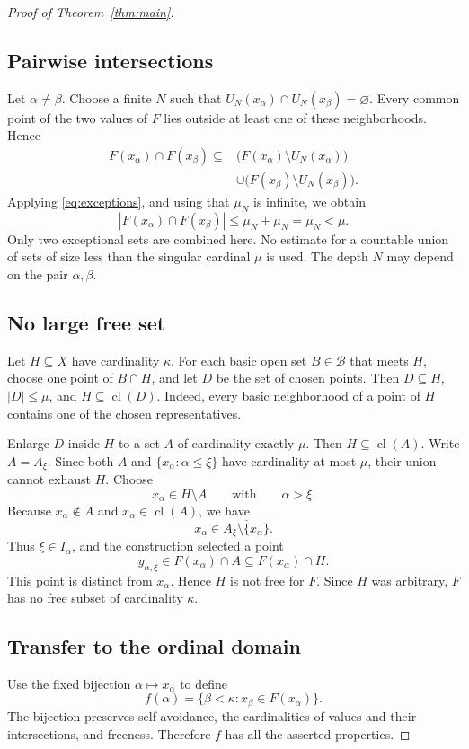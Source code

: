 \documentclass[10pt,leqno]{amsart}
\numberwithin{equation}{section}
\newcommand{\cl}{\operatorname{cl}}
\begin{document}
\begin{proof}[Proof of Theorem~\ref{thm:main}]
\subsection{Pairwise intersections}
Let $\alpha\ne\beta$. Choose a finite $N$ such that
$U_N(x_\alpha)\cap U_N(x_\beta)=\varnothing$. Every common point of the two
values of $F$ lies outside at least one of these neighborhoods. Hence
\[
\begin{split}
 F(x_\alpha)\cap F(x_\beta)\subseteq{}&
   \bigl(F(x_\alpha)\setminus U_N(x_\alpha)\bigr)\\
   &\mathbin{\cup}\bigl(F(x_\beta)\setminus U_N(x_\beta)\bigr).
\end{split}
\]
Applying \eqref{eq:exceptions}, and using that $\mu_N$ is infinite, we obtain
\begin{equation}\label{eq:intersections}
 |F(x_\alpha)\cap F(x_\beta)|
        \leq\mu_N+\mu_N=\mu_N<\mu.
\end{equation}
Only two exceptional sets are combined here. No estimate for a countable
union of sets of size less than the singular cardinal $\mu$ is used. The
depth $N$ may depend on the pair $\alpha,\beta$.

\subsection{No large free set}
Let $H\subseteq X$ have cardinality $\kappa$. For each basic open set
$B\in\mathcal B$ that meets $H$, choose one point of $B\cap H$, and let $D$
be the set of chosen points. Then $D\subseteq H$, $|D|\leq\mu$, and
$H\subseteq\cl(D)$. Indeed, every basic neighborhood of a point of $H$
contains one of the chosen representatives.

Enlarge $D$ inside $H$ to a set $A$ of cardinality exactly $\mu$. Then
$H\subseteq\cl(A)$. Write $A=A_\xi$. Since both $A$ and
$\{x_\alpha:\alpha\leq\xi\}$ have cardinality at most $\mu$, their union
cannot exhaust $H$. Choose
\[
 x_\alpha\in H\setminus A\qquad\text{with}\qquad\alpha>\xi.
\]
Because $x_\alpha\notin A$ and $x_\alpha\in\cl(A)$, we have
\[
 x_\alpha\in\overline{A_\xi\setminus\{x_\alpha\}}.
\]
Thus $\xi\in I_\alpha$, and the construction selected a point
\[
 y_{\alpha,\xi}\in F(x_\alpha)\cap A\subseteq F(x_\alpha)\cap H.
\]
This point is distinct from $x_\alpha$. Hence $H$ is not free for $F$.
Since $H$ was arbitrary, $F$ has no free subset of cardinality $\kappa$.

\subsection{Transfer to the ordinal domain}
Use the fixed bijection $\alpha\mapsto x_\alpha$ to define
\begin{equation}\label{eq:transport}
 f(\alpha)=\{\beta<\kappa:x_\beta\in F(x_\alpha)\}.
\end{equation}
The bijection preserves self-avoidance, the cardinalities of values and
their intersections, and freeness. Therefore $f$ has all the asserted
properties.\qedhere
\end{proof}
\end{document}
